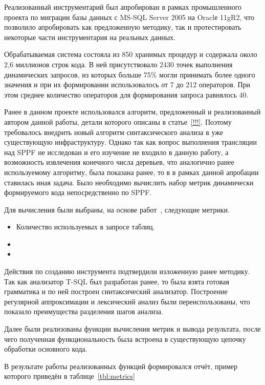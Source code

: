 Реализованный инструментарий был апробирован в рамках промышленного проекта по миграции базы данных с MS-SQL Server 2005 на Oraclе 11gR2, что позволило апробировать как предложенную методику, так и протестировать некоторые части инструментария на реальных данных.

Обрабатываемая система состояла из 850 хранимых процедур и содержала около 2,6 миллионов строк кода. В ней присутствовало 2430 точек выполнения динамических запросов, из которых больше 75\% могли принимать более одного значения и при их формировании использовалось от 7 до 212 операторов. При этом среднее количество операторов для формирования запроса равнялось 40.

Ранее в данном проекте использовался алгоритм, предложенный и реализованный автором данной работы, детали которого описаны в статье~\ref{!!!}. Поэтому требовалось внедрить новый алгоритм синтаксического анализа в уже существующую инфраструктуру. Однако так как вопрос выполнения трансляции над SPPF не исследован и его изучение не входило в данную работу, а возможность извлечения конечного числа деревьев, что аналогично ранее используемому алгоритму, была показана ранее, то в в рамках данной апробации ставилась иная задача. Было необходимо вычислить набор метрик динамически формируемого кода непосредственно по SPPF. 

Для вычисления были выбраны, на основе работ~\cite{DSQLQualityMesure, DSQLQualityMesureBIG, DevelopmentDSQLTools}, следующие метрики.
\begin{itemize}
    \item Количество используемых в запросе таблиц.
    \item    
    \item 
\end{itemize}

Действия по созданию инструмента подтвердили изложенную ранее методику. Так как анализатор T-SQL был разработан ранее, то была взята готовая грамматика и по ней построен синтаксический анализатор. Построение регулярной аппроксимации и лексический анализ были переиспользованы, что показало преимущества разделения шагов анализа.

Далее были реализованы функции вычисления метрик и вывода результата, после чего полученная функциональность была встроена в существующую цепочку обработки основного кода.

В результате работы реализованных функций формировался отчёт, пример которого приведён в таблице~\ref{tbl:metrics}

